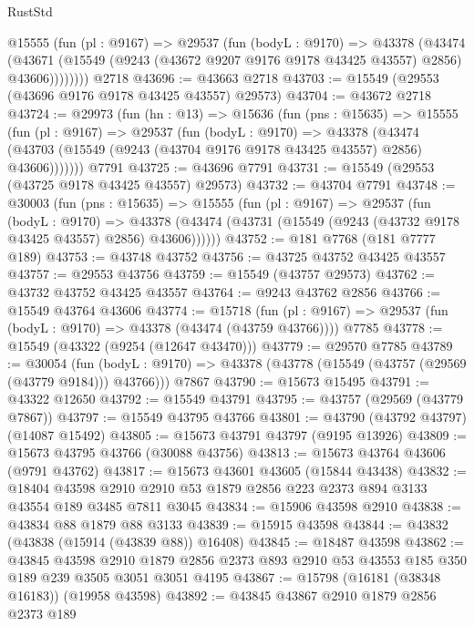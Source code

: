 \begin{lexlean}{RustStd}
\begin{coremodule}
        @15555
          (fun (pl : @9167) =>
          @29537
            (fun (bodyL : @9170) =>
            @43378
              (@43474
                (@43671
                  (@15549 (@9243 (@43672 @9207 @9176 @9178 @43425 @43557) @2856) @43606))))))))
    @2718
@43696 := @43663 @2718
@43703 := @15549 (@29553 (@43696 @9176 @9178 @43425 @43557) @29573)
@43704 := @43672 @2718
@43724 := @29973
    (fun (hn : @13) =>
    @15636
      (fun (pns : @15635) =>
      @15555
        (fun (pl : @9167) =>
        @29537
          (fun (bodyL : @9170) =>
          @43378
            (@43474 (@43703 (@15549 (@9243 (@43704 @9176 @9178 @43425 @43557) @2856) @43606)))))))
    @7791
@43725 := @43696 @7791
@43731 := @15549 (@29553 (@43725 @9178 @43425 @43557) @29573)
@43732 := @43704 @7791
@43748 := @30003
    (fun (pns : @15635) =>
    @15555
      (fun (pl : @9167) =>
      @29537
        (fun (bodyL : @9170) =>
        @43378 (@43474 (@43731 (@15549 (@9243 (@43732 @9178 @43425 @43557) @2856) @43606))))))
@43752 := @181 @7768 (@181 @7777 @189)
@43753 := @43748 @43752
@43756 := @43725 @43752 @43425 @43557
@43757 := @29553 @43756
@43759 := @15549 (@43757 @29573)
@43762 := @43732 @43752 @43425 @43557
@43764 := @9243 @43762 @2856
@43766 := @15549 @43764 @43606
@43774 := @15718
    (fun (pl : @9167) => @29537 (fun (bodyL : @9170) => @43378 (@43474 (@43759 @43766))))
    @7785
@43778 := @15549 (@43322 (@9254 (@12647 @43470)))
@43779 := @29570 @7785
@43789 := @30054
    (fun (bodyL : @9170) => @43378 (@43778 (@15549 (@43757 (@29569 (@43779 @9184))) @43766)))
    @7867
@43790 := @15673 @15495
@43791 := @43322 @12650
@43792 := @15549 @43791
@43795 := @43757 (@29569 (@43779 @7867))
@43797 := @15549 @43795 @43766
@43801 := @43790 (@43792 @43797) (@14087 @15492)
@43805 := @15673 @43791 @43797 (@9195 @13926)
@43809 := @15673 @43795 @43766 (@30088 @43756)
@43813 := @15673 @43764 @43606 (@9791 @43762)
@43817 := @15673 @43601 @43605 (@15844 @43438)
@43832 := @18404
    @43598
    @2910
    @2910
    @53
    @1879
    @2856
    @223
    @2373
    @894
    @3133
    @43554
    @189
    @3485
    @7811
    @3045
@43834 := @15906 @43598 @2910
@43838 := @43834 @88 @1879 @88 @3133
@43839 := @15915 @43598
@43844 := @43832 (@43838 (@15914 (@43839 @88)) @16408)
@43845 := @18487 @43598
@43862 := @43845
    @43598
    @2910
    @1879
    @2856
    @2373
    @893
    @2910
    @53
    @43553
    @185
    @350
    @189
    @239
    @3505
    @3051
    @3051
    @4195
@43867 := @15798 (@16181 (@38348 @16183)) (@19958 @43598)
@43892 := @43845
    @43867
    @2910
    @1879
    @2856
    @2373
    @189

\end{coremodule}
\end{lexlean}

